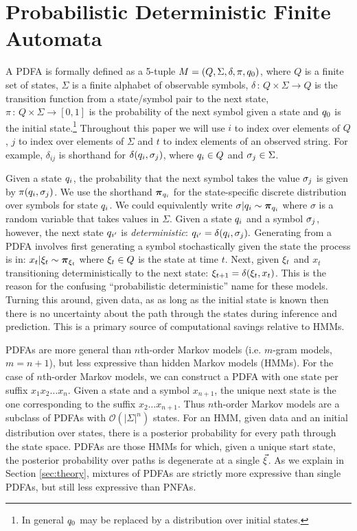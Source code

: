 \section{Probabilistic Deterministic Finite Automata}
\label{sec:PDFA}

A PDFA is formally defined as a 5-tuple $M = (Q,\Sigma,\delta,\pi,\state_0)$, where $Q$ is a finite set of states, $\Sigma$ is a finite alphabet of observable symbols, $\delta\,:\,Q\times\Sigma\rightarrow Q$ is the transition function from a state/symbol pair to the next state, $\pi\,:\,Q\times\Sigma\rightarrow[0,1]$ is the probability of the next symbol given a state and $\state_0$ is the initial state.\footnote{In general $\state_0$ may be replaced by a distribution over initial states.  }  Throughout this paper we will use $i$ to index over elements of $Q$, $j$ to index over elements of $\Sigma$ and $t$ to index elements of an observed string.  For example, $\delta_{ij}$ is shorthand for $\delta(\state_i,\symb_j)$, where $\state_i \in Q$ and $\symb_j \in \Sigma$.

Given a state $\state_i$, the probability that the next symbol takes the value $\symb_j$ is given by $\pi(\state_i,\symb_j)$.  We use the shorthand $\bpi_{q_i}$ for the state-specific discrete distribution over symbols for state $\state_i$.  We could equivalently write $\sigma|\state_i \sim \bpi_{q_i}$ where $\sigma$ is a random variable that takes values in $\Sigma$.  Given a state $\state_i$ and a symbol $\symb_j$, however, the next state $\state_{i'}$ is {\it deterministic}: $\state_{i'} = \delta(\state_i,\symb_j).$   Generating from a PDFA involves first generating a symbol stochastically given the state the process is in: $x_t|\q_t \sim \bpi_{\q_t}$ where $\q_t \in Q$ is the state at time $t$.  Next, given $\q_t$ and $x_t$ transitioning deterministically to the next state: $\q_{t+1} = \delta(\q_t,x_t)$.  This is the reason for the confusing ``probabilistic deterministic'' name for these models.  Turning this around, given data, as as long as the initial state is known then there is no uncertainty about the path through the states during inference and prediction. 
This is a primary source of computational savings relative to HMMs.

PDFAs are more general than $n$th-order Markov models (i.e. $m$-gram models, $m=n+1$), but less expressive than hidden Markov models (HMMs)\cite{Dupont2005}.  For the case of $n$th-order Markov models, we can construct a PDFA with one state per suffix $x_1 x_2 \ldots x_n$.  Given a state and a symbol $x_{n+1}$, the unique next state is the one corresponding to the suffix $x_2 \ldots x_{n+1}$.  Thus $n$th-order Markov models are a subclass of PDFAs with $\mathcal{O}(|\Sigma|^n)$ states.  For an HMM, given data and an initial distribution over states, there is a posterior probability for every path through the state space.  PDFAs are those HMMs for which, given a unique start state, the posterior probability over paths is degenerate at a single $\vec{\q}$.  As we explain in Section \ref{sec:theory}, mixtures of PDFAs are strictly more expressive than single PDFAs, but still less expressive than PNFAs.